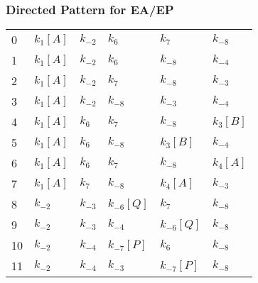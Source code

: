 \documentclass{article}%
\begin{document}
\subsubsection{Directed Pattern for EA/EP}%
\label{ssubsec:Directed Pattern for EA/EP}%
\begin{tabular}{llllll}
\toprule
0  &  $k_{1}$$[A]$ &  $k_{-2}$ &        $k_{6}$ &        $k_{7}$ &      $k_{-8}$ \\
1  &  $k_{1}$$[A]$ &  $k_{-2}$ &        $k_{6}$ &       $k_{-8}$ &      $k_{-4}$ \\
2  &  $k_{1}$$[A]$ &  $k_{-2}$ &        $k_{7}$ &       $k_{-8}$ &      $k_{-3}$ \\
3  &  $k_{1}$$[A]$ &  $k_{-2}$ &       $k_{-8}$ &       $k_{-3}$ &      $k_{-4}$ \\
4  &  $k_{1}$$[A]$ &   $k_{6}$ &        $k_{7}$ &       $k_{-8}$ &  $k_{3}$$[B]$ \\
5  &  $k_{1}$$[A]$ &   $k_{6}$ &       $k_{-8}$ &   $k_{3}$$[B]$ &      $k_{-4}$ \\
6  &  $k_{1}$$[A]$ &   $k_{6}$ &        $k_{7}$ &       $k_{-8}$ &  $k_{4}$$[A]$ \\
7  &  $k_{1}$$[A]$ &   $k_{7}$ &       $k_{-8}$ &   $k_{4}$$[A]$ &      $k_{-3}$ \\
8  &      $k_{-2}$ &  $k_{-3}$ &  $k_{-6}$$[Q]$ &        $k_{7}$ &      $k_{-8}$ \\
9  &      $k_{-2}$ &  $k_{-3}$ &       $k_{-4}$ &  $k_{-6}$$[Q]$ &      $k_{-8}$ \\
10 &      $k_{-2}$ &  $k_{-4}$ &  $k_{-7}$$[P]$ &        $k_{6}$ &      $k_{-8}$ \\
11 &      $k_{-2}$ &  $k_{-4}$ &       $k_{-3}$ &  $k_{-7}$$[P]$ &      $k_{-8}$ \\
\bottomrule
\end{tabular}

%
\end{document}
